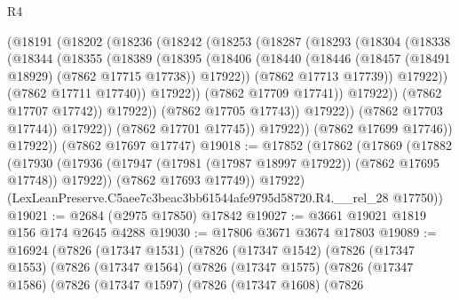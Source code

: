 \begin{lexlean}{R4}
\begin{coremodule}
                        (@18191
                          (@18202
                            (@18236
                              (@18242
                                (@18253
                                  (@18287
                                    (@18293
                                      (@18304
                                        (@18338
                                          (@18344
                                            (@18355
                                              (@18389
                                                (@18395
                                                  (@18406
                                                    (@18440
                                                      (@18446
                                                        (@18457
                                                          (@18491 @18929)
                                                          (@7862 @17715 @17738))
                                                        @17922))
                                                    (@7862 @17713 @17739))
                                                  @17922))
                                              (@7862 @17711 @17740))
                                            @17922))
                                        (@7862 @17709 @17741))
                                      @17922))
                                  (@7862 @17707 @17742))
                                @17922))
                            (@7862 @17705 @17743))
                          @17922))
                      (@7862 @17703 @17744))
                    @17922))
                (@7862 @17701 @17745))
              @17922))
          (@7862 @17699 @17746))
        @17922))
    (@7862 @17697 @17747)
@19018 := @17852
    (@17862
      (@17869
        (@17882
          (@17930 (@17936 (@17947 (@17981 (@17987 @18997 @17922)) (@7862 @17695 @17748)) @17922))
          (@7862 @17693 @17749))
        @17922)
      (LexLeanPreserve.C5aee7c3beac3bb61544afe9795d58720.R4.__rel_28 @17750))
@19021 := @2684 (@2975 @17850) @17842
@19027 := @3661 @19021 @1819 @156 @174 @2645 @4288
@19030 := @17806 @3671 @3674 @17803
@19089 := @16924
    (@7826
      (@17347 @1531)
      (@7826
        (@17347 @1542)
        (@7826
          (@17347 @1553)
          (@7826
            (@17347 @1564)
            (@7826
              (@17347 @1575)
              (@7826
                (@17347 @1586)
                (@7826
                  (@17347 @1597)
                  (@7826
                    (@17347 @1608)
                    (@7826

\end{coremodule}
\end{lexlean}
